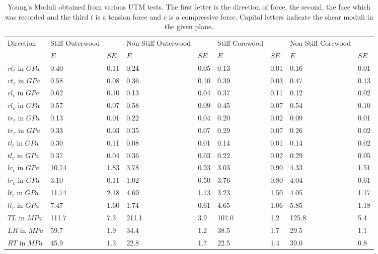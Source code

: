\documentclass[10pt]{article}
\begin{document}
\begin{table}
\caption[Experimental Youngs Moduli]{Young's Moduli obtained from various UTM tests. The first letter is the direction of force, the second, the face which was recorded and the third \(t\) is a tension force and \(c\) is a compressive force. Capital letters indicate the shear moduli in the given plane. }
\label{table:youngs moduli}
\begin{tabular}{lllllllll}
\hline
Direction& Stiff Outerwood && Non-Stiff Outerwood && Stiff Corewood && Non-Stiff Corewood &\\
 & \(E\)&\(SE\)& \(E\)&\(SE\)& \(E\)&\(SE\)& \(E\)&\(SE\)\\
\hline
\(rt_t\) in \(GPa\) & 0.40 & 0.11 & 0.24 & 0.05 & 0.13 & 0.01 & 0.16 & 0.01 \\
\(rt_c\) in \(GPa\) & 0.58 & 0.08 & 0.36 & 0.10 & 0.39 & 0.03 & 0.47 & 0.13 \\
\(rl_t\) in \(GPa\) & 0.62 & 0.10 & 0.13 & 0.04 & 0.37 & 0.11 & 0.12 & 0.02 \\
\(rl_c\) in \(GPa\) & 0.57 & 0.07 & 0.58 & 0.09 & 0.45 & 0.07 & 0.54 & 0.10 \\
\(tr_t\) in \(GPa\) & 0.13 & 0.01 & 0.22 & 0.04 & 0.20 & 0.02 & 0.09 & 0.01 \\
\(tr_c\) in \(GPa\) & 0.33 & 0.03 & 0.35 & 0.07 & 0.29 & 0.07 & 0.26 & 0.02 \\
\(tl_t\) in \(GPa\) & 0.30 & 0.11 & 0.08 & 0.01 & 0.14 & 0.01 & 0.14 & 0.02 \\
\(tl_c\) in \(GPa\) & 0.37 & 0.04 & 0.36 & 0.03 & 0.22 & 0.02 & 0.29 & 0.05 \\
\(lr_t\) in \(GPa\) & 10.74 & 1.83 & 3.78 & 0.93 & 3.03 & 0.90 & 4.33 & 1.51 \\
\(lr_c\) in \(GPa\) & 3.10 & 0.11 & 1.02 & 0.50 & 3.76 & 0.80 & 4.04 & 0.61 \\
\(lt_t\) in \(GPa\) & 11.74 & 2.18 & 4.69 & 1.13 & 3.23& 1.50 & 4.05 & 1.17 \\
\(lt_c\) in \(GPa\) & 7.47 & 1.60 & 1.74 & 0.61 & 4.65 & 1.06 & 5.85 & 1.18 \\
\(TL\) in \(MPa\)   & 111.7 & 7.3 & 211.1& 3.9  & 107.0& 1.2  & 125.8& 5.4 \\
\(LR\) in \(MPa\)   & 59.7 & 1.9  & 34.4 & 1.2  & 38.5 & 1.7  & 29.5 & 1.1 \\
\(RT\) in \(MPa\)   & 45.9 & 1.3  & 22.8 & 1.7  & 22.5 & 1.4  & 39.0 & 0.8 \\
\hline
\end{tabular}
\end{table}
\end{document}
